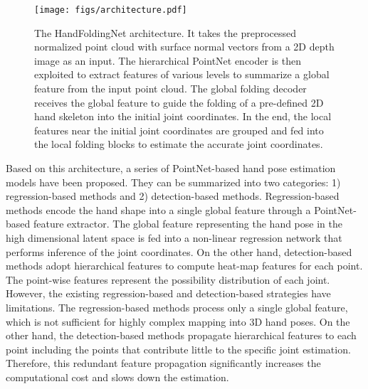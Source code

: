 \documentclass[10pt,twocolumn,letterpaper]{article}
\begin{document}
\begin{figure*}
\centering
\texttt{[image: figs/architecture.pdf]}
\caption{The HandFoldingNet architecture. It takes the preprocessed normalized point cloud with surface normal vectors from a 2D depth image as an input. The hierarchical PointNet encoder is then exploited to extract features of various levels to summarize a global feature from the input point cloud. The global folding decoder receives the global feature to guide the folding of a pre-defined 2D hand skeleton into the initial joint coordinates. In the end, the local features near the initial joint coordinates are grouped and fed into the local folding blocks to estimate the accurate joint coordinates.}
\label{fig:architecture}
\end{figure*}


Based on this architecture, a series of PointNet-based hand pose estimation models \cite{ge2018hand, ge2018point, chen2018shpr, li2019point} have been proposed. They can be summarized into two categories: 1) regression-based methods and 2) detection-based methods. Regression-based methods \cite{ge2018hand, chen2018shpr} encode the hand shape into a single global feature through a PointNet-based feature extractor. The global feature representing the hand pose in the high dimensional latent space is fed into a non-linear regression network that performs inference of the joint coordinates. On the other hand, detection-based methods \cite{ge2018point, li2019point} adopt hierarchical features to compute heat-map features for each point. The point-wise features represent the possibility distribution of each joint. However, the existing regression-based and detection-based strategies have limitations. The regression-based methods process only a single global feature, which is not sufficient for highly complex mapping into 3D hand poses. On the other hand, the detection-based methods propagate hierarchical features to each point including the points that contribute little to the specific joint estimation. Therefore, this redundant feature propagation significantly increases the computational cost and slows down the estimation.
\end{document}
